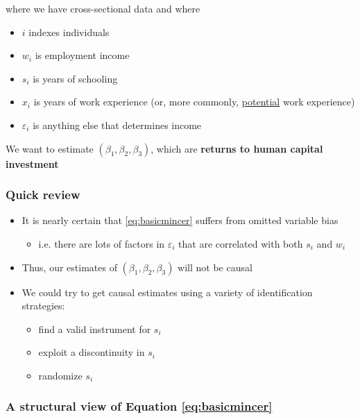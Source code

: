 \documentclass[11pt]{article}
\begin{document}
where we have cross-sectional data and where
\begin{itemize}
\item \(i\) indexes individuals
\item \(w_{i}\) is employment income
\item \(s_{i}\) is years of schooling
\item \(x_{i}\) is years of work experience (or, more commonly, \uline{potential} work experience)
\item \(\varepsilon_{i}\) is anything else that determines income
\end{itemize}

We want to estimate \(\left(\beta_1,\beta_2,\beta_3\right)\), which are \textbf{returns to human capital investment}

\subsubsection{Quick review}
\label{sec:orgbb38586}

\begin{itemize}
\item It is nearly certain that \eqref{eq:basicmincer} suffers from omitted variable bias

\begin{itemize}
\item i.e. there are lots of factors in \(\varepsilon_{i}\) that are correlated with both \(s_i\) and \(w_i\)
\end{itemize}

\item Thus, our estimates of \(\left(\beta_1,\beta_2,\beta_3\right)\) will not be causal

\item We could try to get causal estimates using a variety of identification strategies:

\begin{itemize}
\item find a valid instrument for \(s_i\) \cite{angristKrueger1991,card1995}
\item exploit a discontinuity in \(s_i\) \cite{ost_al2018}
\item randomize \(s_i\) \cite{attanasio_al2011}
\end{itemize}
\end{itemize}

\subsubsection{A structural view of Equation \eqref{eq:basicmincer}}
\label{sec:org35fb45c}
\end{document}
